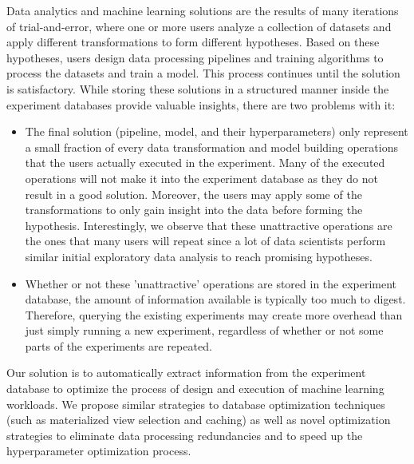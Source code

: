 Data analytics and machine learning solutions are the results of many iterations of trial-and-error, where one or more users analyze a collection of datasets and apply different transformations to form different hypotheses.
Based on these hypotheses, users design data processing pipelines and training algorithms to process the datasets and train a model.
This process continues until the solution is satisfactory. 
While storing these solutions in a structured manner inside the experiment databases provide valuable insights, there are two problems with it:
\begin{itemize}
\item 
The final solution (pipeline, model, and their hyperparameters) only represent a small fraction of every data transformation and model building operations that the users actually executed in the experiment. 
Many of the executed operations will not make it into the experiment database as they do not result in a good solution.
Moreover, the users may apply some of the transformations to only gain insight into the data before forming the hypothesis. 
Interestingly, we observe that these unattractive operations are the ones that many users will repeat since a lot of data scientists perform similar initial exploratory data analysis to reach promising hypotheses.
\item 
Whether or not these 'unattractive' operations are stored in the experiment database, the amount of information available is typically too much to digest.
Therefore, querying the existing experiments may create more overhead than just simply running a new experiment, regardless of whether or not some parts of the experiments are repeated.
\end{itemize}

Our solution is to automatically extract information from the experiment database to optimize the process of design and execution of machine learning workloads.
We propose similar strategies to database optimization techniques (such as materialized view selection and caching) as well as novel optimization strategies to eliminate data processing redundancies and to speed up the hyperparameter optimization process.

